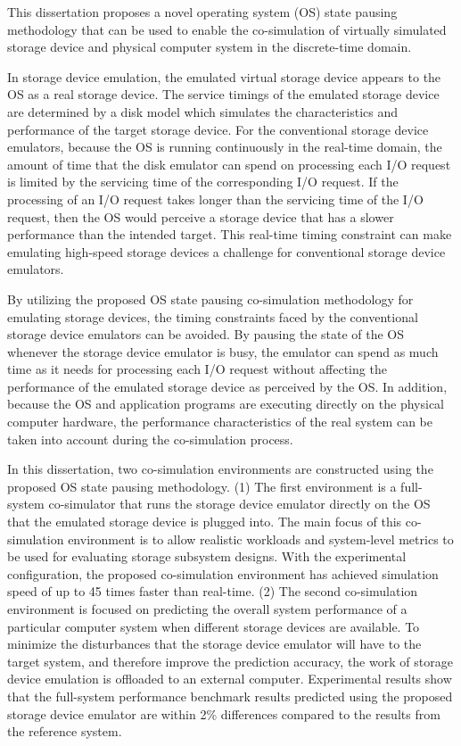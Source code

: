 \begin{abstractEN}

This dissertation proposes a novel operating system (OS) state pausing methodology that can be used to enable the co-simulation of virtually simulated storage device and physical computer system in the discrete-time domain. 

In storage device emulation, the emulated virtual storage device appears to the OS as a real storage device. The service timings of the emulated storage device are determined by a disk model which simulates the characteristics and performance of the target storage device. For the conventional storage device emulators, because the OS is running continuously in the real-time domain, the amount of time that the disk emulator can spend on processing each I/O request is limited by the servicing time of the corresponding I/O request. If the processing of an I/O request takes longer than the servicing time of the I/O request, then the OS would perceive a storage device that has a slower performance than the intended target. This real-time timing constraint can make emulating high-speed storage devices a challenge for conventional storage device emulators.

By utilizing the proposed OS state pausing co-simulation methodology for emulating storage devices, the timing constraints faced by the conventional storage device emulators can be avoided. By pausing the state of the OS whenever the storage device emulator is busy, the emulator can spend as much time as it needs for processing each I/O request without affecting the performance of the emulated storage device as perceived by the OS. In addition, because the OS and application programs are executing directly on the physical computer hardware, the performance characteristics of the real system can be taken into account during the co-simulation process.

In this dissertation, two co-simulation environments are constructed using the proposed OS state pausing methodology. (1) The first environment is a full-system co-simulator that runs the storage device emulator directly on the OS that the emulated storage device is plugged into. The main focus of this co-simulation environment is to allow realistic workloads and system-level metrics to be used for evaluating storage subsystem designs. With the experimental configuration, the proposed co-simulation environment has achieved simulation speed of up to 45 times faster than real-time. (2) The second co-simulation environment is focused on predicting the overall system performance of a particular computer system when different storage devices are available. To minimize the disturbances that the storage device emulator will have to the target system, and therefore improve the prediction accuracy, the work of storage device emulation is offloaded to an external computer. Experimental results show that the full-system performance benchmark results predicted using the proposed storage device emulator are within 2\% differences compared to the results from the reference system.

\end{abstractEN}